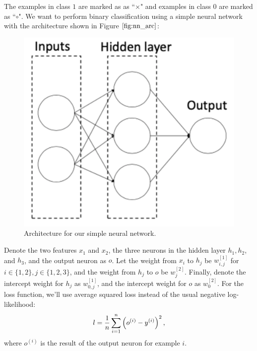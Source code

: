 The examples in class $1$ are marked as as ``$\times$" and examples in class $0$ are marked as ``$\circ$". We want to perform binary classification using a simple neural network with the architecture shown in Figure $\ref{fig:nn_arc}$:
\begin{figure}[htbp]
    \centering
    \includegraphics[scale=0.3, clip]{simple_nn/nn_architecture.png}
    \caption{Architecture for our simple neural network.}
     \label{fig:nn_arc}
\end{figure}

Denote the two features $x_1$ and $x_2$, the three neurons in the hidden layer $h_1, h_2$, and $h_3$, and the output neuron as $o$. Let the weight from $x_i$ to $h_j$ be $w_{i, j}^{[1]}$ for $i \in \{1, 2\}, j \in \{1, 2, 3\}$, and the weight from $h_j$ to $o$ be $w_{j}^{[2]}$. Finally, denote the intercept weight for $h_j$ as $w_{0, j}^{[1]}$, and the intercept weight for $o$ as $w_{0}^{[2]}$. For the loss function, we'll use average squared loss instead of the usual negative log-likelihood:
$$l = \frac{1}{{n}}\sum_{i=1}^{{n}} \left(o^{(i)} - y^{(i)}\right)^2,$$
where $o^{(i)}$ is the result of the output neuron for example $i$.

\begin{enumerate}
  
\newpage
\ifnum{} {
  
} \fi

  

\ifnum{} {
  
} \fi

  
\ifnum{} {
  
} \fi


\end{enumerate}
